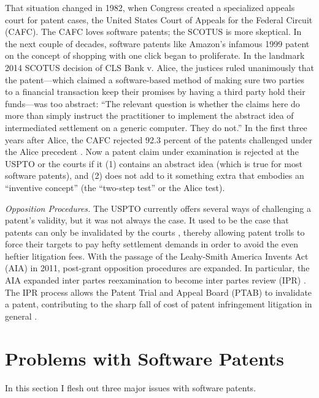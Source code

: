 \documentclass[12pt]{texMemo} %
\begin{document}
That situation changed in 1982, when Congress created a specialized appeals court for patent cases, the United States Court of Appeals for the Federal Circuit (CAFC). The CAFC loves software patents; the SCOTUS is more skeptical. In the next couple of decades, software patents like Amazon’s infamous 1999 patent on the concept of shopping with one click \cite{amazon} began to proliferate. In the landmark 2014 SCOTUS decision of CLS Bank v. Alice, the justices ruled unanimously that the patent—which claimed a software-based method of making sure two parties to a financial transaction keep their promises by having a third party hold their funds—was too abstract: “The relevant question is whether the claims here do more than simply instruct the practitioner to implement the abstract idea of intermediated settlement on a generic computer. They do not.” In the first three years after Alice, the CAFC rejected 92.3 percent of the patents challenged under the Alice precedent \cite{lee-scotus}. Now a patent claim under examination is rejected at the USPTO or the courts if it (1) contains an abstract idea (which is true for most software patents), and (2) does not add to it something extra that embodies an “inventive concept” (the “two-step test” or the Alice test).

\textit{Opposition Procedures.} The USPTO currently offers several ways of challenging a patent’s validity, but it was not always the case. It used to be the case that patents can only be invalidated by the courts \cite{lopez}, thereby allowing patent trolls to force their targets to pay hefty settlement demands in order to avoid the even heftier litigation fees. With the passage of the Leahy-Smith America Invents Act (AIA) in 2011, post-grant opposition procedures are expanded. In particular, the AIA expanded inter partes reexamination to become inter partes review (IPR) \cite{aia}. The IPR process allows the Patent Trial and Appeal Board (PTAB) to invalidate a patent, contributing to the sharp fall of cost of patent infringement litigation in general \cite{nayak}.

\section{Problems with Software Patents}

In this section I flesh out three major issues with software patents.
\end{document}

